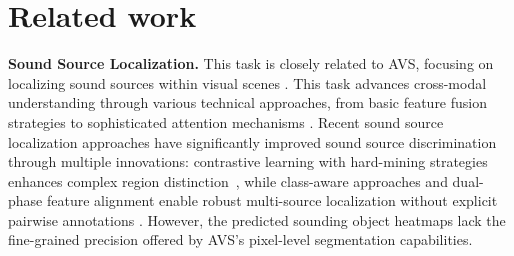 \section{Related work}
\label{sec:related_new}
\vspace{-4pt}


\textbf{Sound Source Localization.}
This task is closely related to AVS, focusing on localizing sound sources within visual scenes \cite{arandjelovic2018objects, senocak2018learning,mo2022closer, chen2021localizing,mahmud2024t}. This task advances cross-modal understanding through various technical approaches, from basic feature fusion strategies to sophisticated attention mechanisms \cite{senocak2018learning, mo2022closer, hu2020discriminative, qian2020multiple}.
Recent sound source localization approaches have significantly improved sound source discrimination through multiple innovations: contrastive learning with hard-mining strategies enhances complex region distinction~\cite{chen2021localizing, hu2020discriminative, mo2022closer}, while class-aware approaches and dual-phase feature alignment enable robust multi-source localization without explicit pairwise annotations \cite{hu2020discriminative, qian2020multiple, chen2021localizing}.
However, the predicted sounding object heatmaps lack the fine-grained precision offered by AVS's pixel-level segmentation capabilities.


